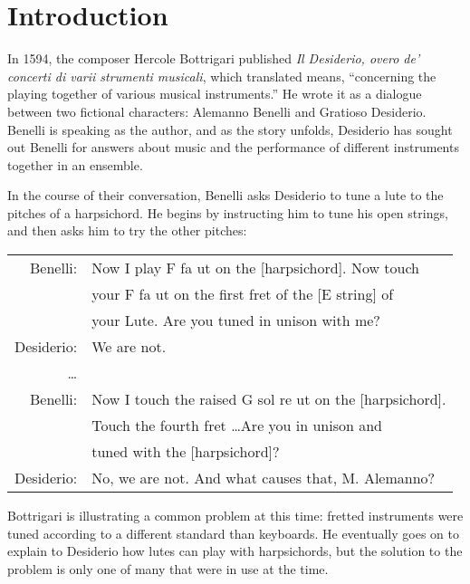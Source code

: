 \chapter*{Introduction}

In 1594, the composer Hercole Bottrigari published \textit{Il Desiderio, overo de' concerti di varii strumenti
musicali}, which translated means, ``concerning the playing together of various musical instruments.'' He wrote it as a
dialogue between two fictional characters: Alemanno Benelli and Gratioso Desiderio. Benelli is speaking as the author,
and as the story unfolds, Desiderio has sought out Benelli for answers about music and the performance of different
instruments together in an ensemble.

In the course of their conversation, Benelli asks Desiderio to tune a lute to the pitches of a harpsichord. He begins
by instructing him to tune his open strings, and then asks him to try the other pitches:
\autocite[18]{HB:1}

\begin{blocks}
\begin{center}
\begin{tabular}{r l}
Benelli:  & Now I play F fa ut on the [harpsichord]. Now touch       \\
      & your F fa ut on the first fret of the [E string] of          \\
      & your Lute. Are you tuned in unison with me?                  \\
Desiderio: & We are not.                                             \\
\ldots   &                                                           \\
Benelli:  & Now I touch the raised G sol re ut on the [harpsichord]. \\ 
      & Touch the fourth fret \ldots Are you in unison and           \\
      & tuned with the [harpsichord]?                                \\
Desiderio: & No, we are not. And what causes that, M. Alemanno?      \\
\end{tabular}
\end{center}
\end{blocks}

Bottrigari is illustrating a common problem at this time: fretted instruments were tuned according to a different
standard than keyboards. He eventually goes on to explain to Desiderio how lutes can play with harpsichords, but the
solution to the problem is only one of many that were in use at the time.
 
